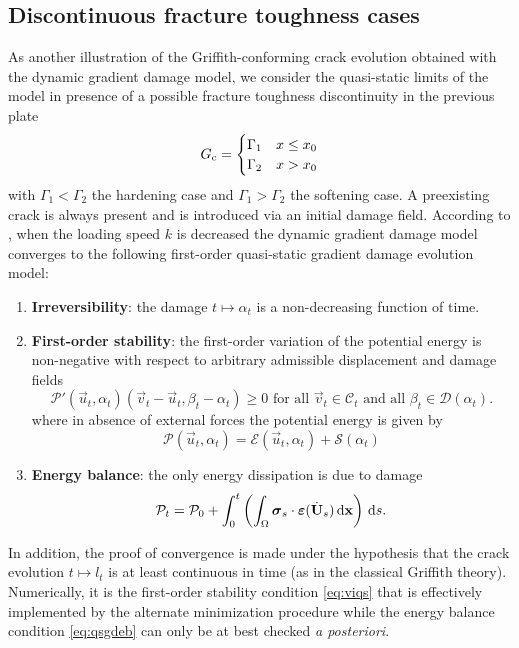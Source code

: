 \subsection{Discontinuous fracture toughness cases}
As another illustration of the Griffith-conforming crack evolution obtained with the dynamic gradient damage model, we consider the quasi-static limits of the model in presence of a possible fracture toughness discontinuity in the previous plate
\[
G_\mathrm{c}=\begin{cases}
\Gamma_1 & x\leq x_0 \\
\Gamma_2 & x>x_0
\end{cases}
\]
with $\Gamma_1<\Gamma_2$ the hardening case and $\Gamma_1>\Gamma_2$ the softening case. A preexisting crack is always present and is introduced via an initial damage field. According to \cite{Versieux:2015}, when the loading speed $k$ is decreased the dynamic gradient damage model converges to the following first-order quasi-static gradient damage evolution model:
\begin{enumerate}
\item \textbf{Irreversibility}: the damage $t\mapsto\alpha_t$ is a non-decreasing function of time.
\item \textbf{First-order stability}: the first-order variation of the potential energy is non-negative with respect to arbitrary admissible displacement and damage fields
\begin{equation} \label{eq:viqs}
\mathcal{P}'(\vec{u}_t,\alpha_t)(\vec{v}_t-\vec{u}_t,\beta_t-\alpha_t)\geq 0\text{ for all $\vec{v}_t\in\mathcal{C}_t$ and all $\beta_t\in\mathcal{D}(\alpha_t)$}.
\end{equation}
where in absence of external forces the potential energy is given by 
\[
\mathcal{P}(\vec{u}_t,\alpha_t)=\mathcal{E}(\vec{u}_t,\alpha_t)+\mathcal{S}(\alpha_t)
\]
\item \textbf{Energy balance}: the only energy dissipation is due to damage
\begin{equation} \label{eq:qsgdeb}
\mathcal{P}_t=\mathcal{P}_0+\int_0^t\left(\int_\Omega\sig_s\cdot\eps(\dot{\vec{U}}_s)\dx\right)\D{s}.
\end{equation}
\end{enumerate}
In addition, the proof of convergence is made under the hypothesis that the crack evolution $t\mapsto l_t$ is at least continuous in time (as in the classical Griffith theory). Numerically, it is the first-order stability condition \eqref{eq:viqs} that is effectively implemented by the alternate minimization procedure \cite{PhamAmorMarigoMaurini:2011} while the energy balance condition \eqref{eq:qsgdeb} can only be at best checked \emph{a posteriori}.

